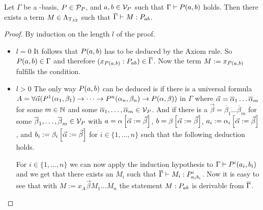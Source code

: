 \begin{lemma}
Let $\Gamma$ be a \SysP-basis, $P\in\mathcal{P}_P$, and $\predPFst,\predPSnd\in\VarP$ such that $\Gamma\PModels P(\predPFst,\predPSnd)$ holds.
Then there exists a term $M\in\Lambda_{\text{T}_{\lambda2}}$ such that $\trans{\Gamma}\lambdaModels M: \code{P}{\predPFst}{\predPSnd}$.
\end{lemma}
\begin{proof}
By induction on the length $l$ of the proof.%

\begin{itemize}
	\item[] \underline{$l=0$} It follows that $P(\predPFst,\predPSnd)$ has to be deduced by the Axiom rule. So $P(\predPFst,\predPSnd)\in\Gamma$ and therefore $(x_{P(\predPFst,\predPSnd)}:\code{P}{\predPFst}{\predPSnd})\in\trans{\Gamma}$. Now the term $M:=x_{P(\predPFst,\predPSnd)}$ fulfills the condition.
	
	\item[] \underline{$l>0$} The only way $P(\predPFst,\predPSnd)$ can be deduced is if there is a universal formula $A=\forall\predVec(P^1(\predFst[1],\predSnd[1])\to\dots\to P^n(\predFst[n],\predSnd[n])\to P(\predFst,\predSnd))$ in $\Gamma$ where $\predVec=\predVec[1]\dots\predVec[m]$ for some $m\in\mathbb{N}$ and some $\predVec[1],\dots,\predVec[m]\in\VarP$. And if there is a $\vec{\beta}=\overline{\beta}_1\dots\overline{\beta}_m$ for some $\overline{\beta}_1,\dots,\overline{\beta}_m\in\mathcal{V}_P$ with $\predPFst=\predFst\left[\predVec:=\vec{\beta}\right]$, $\predPSnd=\predSnd\left[\predVec:=\vec{\beta}\right]$,
	$\predPFst[i]:=\predFst[i]\left[\predVec:=\vec{\beta}\right]$, and $\predPSnd[i]:=\predSnd[i]\left[\predVec:=\vec{\beta}\right]$ for $i\in\{1,\dots,n\}$ such that the following deduction holds.
	
	\begin{figure}[H]
		\centering
		
	\end{figure}
	
	For $i\in\{1,\dots,n\}$ we can now apply the induction hypothesis to $\Gamma\PModels P^i(\predPFst[i],\predPSnd[i])$ and we get that there exists an $M_i$ such that $\trans{\Gamma}\lambdaModels M_i:\code{P^i}{\predPFst[i]}{\predPSnd[i]}$. Now it is easy to see that with $M:=x_A\vec{\beta}M_1\dots M_n$ the statement $M:\code{P}{\predPFst}{\predPSnd}$ is derivable from $\overline{\Gamma}$.
\end{itemize}
\end{proof}

